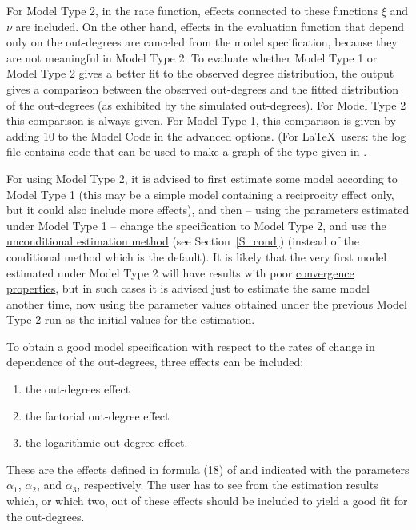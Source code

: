 \documentclass[a4paper,fleqn,11pt]{article}
\newcommand{\+}{\, + \,}
\begin{document}
For Model Type 2, in the rate function, effects connected to these
functions $\xi$ and $\nu$ are included. On the other hand, effects
in the evaluation function that depend only on the out-degrees are
canceled from the model specification, because they are not
meaningful in Model Type 2. To evaluate whether Model Type 1 or
Model Type 2 gives a better fit to the observed degree distribution,
the output gives a comparison between the observed out-degrees and
the fitted distribution of the out-degrees (as exhibited by the
simulated out-degrees). For Model Type 2 this comparison is always
given. For Model Type 1, this comparison is given by adding 10 to the
Model Code in the advanced options. (For \LaTeX\ users: the log
file contains code that can be used to make a graph of the type
given in \citet{Snijders03}.

For using Model Type 2, it is advised to first estimate some model
according to Model Type 1 (this may be a simple model containing a
reciprocity effect only, but it could also include more effects),
and then -- using the parameters estimated under Model Type 1 --
change the specification to Model Type 2, and use the
\hyperlink{T_S_cond}{unconditional estimation method}
(see Section~\ref{S_cond}) (instead of the conditional method which is the
default). It is likely that the very first model estimated under
Model Type 2 will have results with poor
\hyperlink{T_convergence}{convergence properties}, but in such
cases it is advised just to estimate the same model another time,
now using the parameter values obtained under the previous Model
Type 2 run as the initial values for the estimation.

To obtain a good model specification with respect to the rates of
change in dependence of the out-degrees, three effects can be
included:
\begin{enumerate}
\item the out-degrees effect
\item the factorial out-degree effect
\item the logarithmic out-degree effect.
\end{enumerate}
These are the effects defined in formula (18) of \citet{Snijders03}
and indicated with the parameters $\alpha_1$, $\alpha_2$,
and $\alpha_3$, respectively.
The user has to see from the estimation results which, or which two,
out of these effects
should be included to yield a good fit for the out-degrees.
\medskip
\fi
\end{document}

